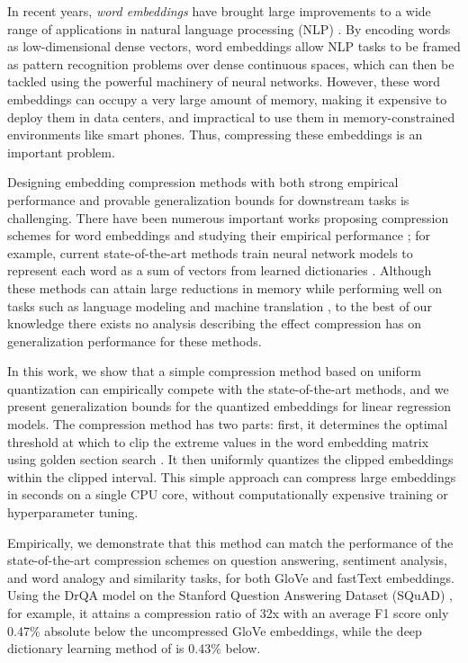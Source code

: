 In recent years, \textit{word embeddings} \citep{word2vec13,glove14,fasttext18} have brought large improvements to a wide range of applications in natural language processing (NLP) \citep{collins16,drqa17}.
By encoding words as low-dimensional dense vectors, word embeddings allow NLP tasks to be framed as pattern recognition problems over dense continuous spaces, which can then be tackled using the powerful machinery of neural networks.
However, these word embeddings can occupy a very large amount of memory, making it expensive to deploy them in data centers, and impractical to use them in memory-constrained environments like smart phones.
Thus, compressing these embeddings is an important problem.

Designing embedding compression methods with both strong empirical performance and provable generalization bounds for downstream tasks is challenging.
There have been numerous important works proposing compression schemes for word embeddings and studying their empirical performance \citep{sparse16,andrews16,dccl17,chen2018learning};
for example, current state-of-the-art methods train neural network models to represent each word as a sum of vectors from learned dictionaries \citep{dccl17}.
Although these methods can attain large reductions in memory while performing well on tasks such as language modeling \citep{mikolov10} and machine translation \citep{bahdanau15}, to the best of our knowledge there exists no analysis describing the effect compression has on generalization performance for these methods.

In this work, we show that a simple compression method based on uniform quantization can empirically compete with the state-of-the-art methods, and we present generalization bounds for the quantized embeddings for linear regression models.
The compression method has two parts: first, it determines the optimal threshold at which to clip the extreme values in the word embedding matrix using golden section search \citep{golden53}.
It then uniformly quantizes the clipped embeddings within the clipped interval.
This simple approach can compress large embeddings in seconds on a single CPU core, without computationally expensive training or hyperparameter tuning.

Empirically, we demonstrate that this method can match the performance of the state-of-the-art compression schemes on question answering, sentiment analysis, and word analogy and similarity tasks, for both GloVe \citep{glove14} and fastText \citep{fasttext18} embeddings.
Using the DrQA model \citep{drqa17} on the Stanford Question Answering Dataset (SQuAD) \citep{squad16}, for example, it attains a compression ratio of 32x with an average F1 score only 0.47\% absolute below the uncompressed GloVe embeddings, while the deep dictionary learning method of \citet{dccl17} is 0.43\% below.

